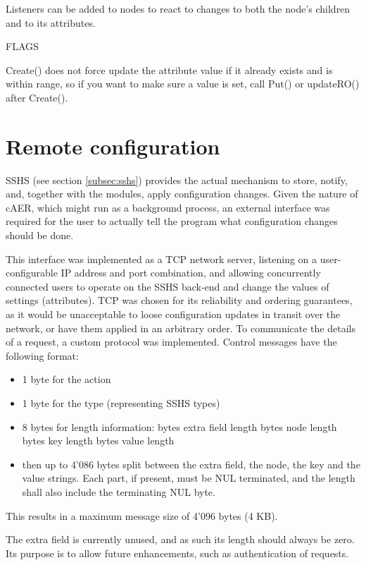 \documentclass[a4paper,12pt]{report}
\begin{document}
Listeners can be added to nodes to react to changes to both the node's children and to its attributes.

FLAGS

Create() does not force update the attribute value if it already exists and is within range,
so if you want to make sure a value is set, call Put() or updateRO() after Create().

\section{Remote configuration} \label{subsec:remote_configuration}

SSHS (see section \ref{subsec:sshs}) provides the actual mechanism to store, notify, and, together with the modules, apply configuration changes. Given the nature of cAER, which might run as a background process, an external interface was required for the user to actually tell the program what configuration changes should be done.

This interface was implemented as a TCP network server, listening on a user-configurable IP address and port combination, and allowing concurrently connected users to operate on the SSHS back-end and change the values of settings (attributes).
TCP was chosen for its reliability and ordering guarantees, as it would be unacceptable to loose configuration updates in transit over the network, or have them applied in an arbitrary order.
\clearpage
To communicate the details of a request, a custom protocol was implemented.
Control messages have the following format:
\begin{itemize}
\item 1 byte for the action
\item 1 byte for the type (representing SSHS types)
\item 8 bytes for length information:
 bytes extra field length
 bytes node length
 bytes key length
 bytes value length
\item then up to 4'086 bytes split between the extra field, the node, the key and the value strings. Each part, if present, must be NUL terminated, and the length shall also include the terminating NUL byte.
\end{itemize}
This results in a maximum message size of 4'096 bytes (4 KB).

The extra field is currently unused, and as such its length should always be zero. Its purpose is to allow future enhancements, such as authentication of requests.
\end{document}
